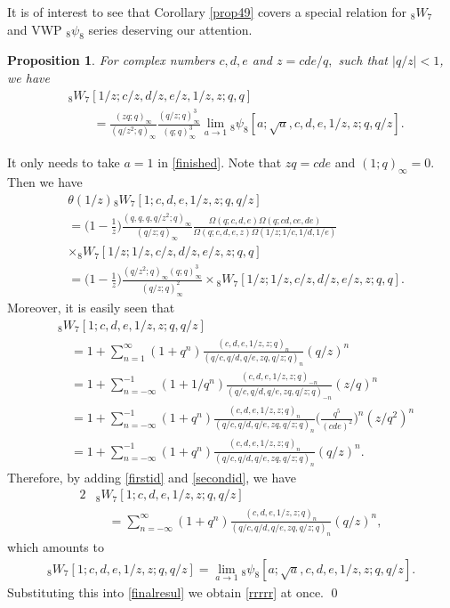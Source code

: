 \documentclass[xits,review,sort&compress]{elsarticle}
\newtheorem{xinzhi}[dl]{Proposition}
\numberwithin{equation}{section}
\newcommand{\poq}[2]{(#1;q)_{#2}}
\def\pf{\noindent {\it Proof.} }
\begin{document}
It is of interest to see that Corollary \ref{prop49}  covers a special relation for  ${}_{8}W_{7}$ and VWP ${}_{8}\psi_{8}$ series deserving our attention.
\begin{xinzhi}  For complex numbers $c,d,e$ and $z=cde/q,$  such that $|q/z|<1$, we have
\begin{align}
& {}_{8}W_{7}[1/z ; c/z,d/z,e/z,1/z,z; q, q]\label{rrrrr}\\
&\qquad=\frac{(zq;q)_\infty}{(q/z^2;q)_\infty}\frac{\left(q/z;q\right)_{\infty}^3}{(q; q)_{\infty}^3}\lim_{a\to 1}{}_{8}\psi_{8}[a;\sqrt{a},c,d,e,1/z, z; q, q/z].\nonumber
\end{align}
  \end{xinzhi}
\pf It  only needs to take $a=1$ in \eqref{finished}. Note that $zq=cde$ and $(1;q)_\infty=0$.  Then we have
\begin{align}&\theta(1/z){}_{8}W_{7}[1;c,d,e,1/z, z; q, q/z]\nonumber\\
&=\bigg(1-\frac{1}{z}\bigg)\frac{(q,q, q ,q/z^2; q)_{\infty}}{\left(q/z;q\right)_{\infty}}\frac{\Omega(q;c,d,e)\Omega(q;cd,ce,de)}{\Omega(q;c,d,e,z)\Omega(1/z;1/c,1/d, 1/e)}\nonumber\\
  &\times{}_{8}W_{7}[1/z ; 1/z, c/z, d/z, e/z, z; q, q]\nonumber\\
&=\bigg(1-\frac{1}{z}\bigg)\frac{(q/z^2; q)_{\infty}(q; q)_{\infty}^3}{\left(q/z;q\right)_{\infty}^2}\times{}_{8}W_{7}[1/z ; 1/z, c/z, d/z, e/z, z; q, q].\label{finalresul}
\end{align}
Moreover, it is easily seen that
\begin{align}
&{}_{8}W_{7}[1;c,d,e,1/z, z; q, q/z]
\nonumber\\
&\quad=1+\sum_{n=1}^\infty(1+q^n)\frac{\poq{c,d,e,1/z,z}{n}}{\poq{q/c,q/d,q/e,zq,q/z}{n}}(q/z)^n\label{firstid}\\
&\quad=1+\sum^{-1}_{n=-\infty}(1+1/q^n)\frac{\poq{c,d,e,1/z,z}{-n}}{\poq{q/c,q/d,q/e,zq,q/z}{-n}}(z/q)^n\nonumber\\
&\quad=1+\sum^{-1}_{n=-\infty}(1+q^n)\frac{\poq{c,d,e,1/z,z}{n}}{\poq{q/c,q/d,q/e,zq,q/z}{n}}\bigg(\frac{q^5}{(cde)^2}\bigg)^n(z/q^2)^n\nonumber\\
&\quad=1+\sum^{-1}_{n=-\infty} (1+q^n)\frac{\poq{c,d,e,1/z,z}{n}}{\poq{q/c,q/d,q/e,zq,q/z}{n}}(q/z)^n.\label{secondid}
\end{align}
Therefore, by adding \eqref{firstid} and \eqref{secondid}, we have
\begin{align*}
2&{}_{8}W_{7}[1;c,d,e,1/z, z; q, q/z]\\
&\quad=\sum_{n=-\infty}^\infty(1+q^n)\frac{\poq{c,d,e,1/z,z}{n}}{\poq{q/c,q/d,q/e,zq,q/z}{n}}(q/z)^n,
\end{align*}
which amounts to
\begin{align*}{}_{8}W_{7}[1;c,d,e,1/z, z; q, q/z]=\lim_{a\to 1}{}_{8}\psi_{8}[a;\sqrt{a},c,d,e,1/z, z; q, q/z].
\end{align*}
Substituting this into \eqref{finalresul}  we obtain \eqref{rrrrr} at once.
\qed
\end{document}
